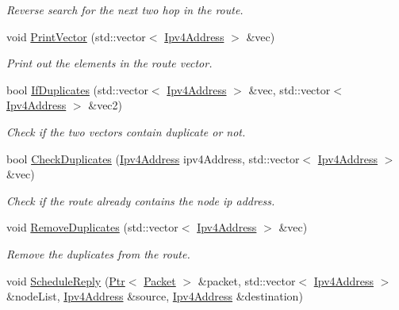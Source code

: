 \begin{DoxyCompactItemize}
\begin{DoxyCompactList}\small\item\em Reverse search for the next two hop in the route. \end{DoxyCompactList}\item 
void \hyperlink{classns3_1_1dsr_1_1DsrOptions_a44ae8e58769880ec9c0150bb28652350}{Print\+Vector} (std\+::vector$<$ \hyperlink{classns3_1_1Ipv4Address}{Ipv4\+Address} $>$ \&vec)
\begin{DoxyCompactList}\small\item\em Print out the elements in the route vector. \end{DoxyCompactList}\item 
bool \hyperlink{classns3_1_1dsr_1_1DsrOptions_a46fdbfab9423d644ad211c55b32ed74d}{If\+Duplicates} (std\+::vector$<$ \hyperlink{classns3_1_1Ipv4Address}{Ipv4\+Address} $>$ \&vec, std\+::vector$<$ \hyperlink{classns3_1_1Ipv4Address}{Ipv4\+Address} $>$ \&vec2)
\begin{DoxyCompactList}\small\item\em Check if the two vectors contain duplicate or not. \end{DoxyCompactList}\item 
bool \hyperlink{classns3_1_1dsr_1_1DsrOptions_a2d973cc79c1a784317f3b03a834a831e}{Check\+Duplicates} (\hyperlink{classns3_1_1Ipv4Address}{Ipv4\+Address} ipv4\+Address, std\+::vector$<$ \hyperlink{classns3_1_1Ipv4Address}{Ipv4\+Address} $>$ \&vec)
\begin{DoxyCompactList}\small\item\em Check if the route already contains the node ip address. \end{DoxyCompactList}\item 
void \hyperlink{classns3_1_1dsr_1_1DsrOptions_a7b822a7c827006feddd82cc9baab03bd}{Remove\+Duplicates} (std\+::vector$<$ \hyperlink{classns3_1_1Ipv4Address}{Ipv4\+Address} $>$ \&vec)
\begin{DoxyCompactList}\small\item\em Remove the duplicates from the route. \end{DoxyCompactList}\item 
void \hyperlink{classns3_1_1dsr_1_1DsrOptions_aad85e853073be9d366e5f5d16a66d6f5}{Schedule\+Reply} (\hyperlink{classns3_1_1Ptr}{Ptr}$<$ \hyperlink{classns3_1_1Packet}{Packet} $>$ \&packet, std\+::vector$<$ \hyperlink{classns3_1_1Ipv4Address}{Ipv4\+Address} $>$ \&node\+List, \hyperlink{classns3_1_1Ipv4Address}{Ipv4\+Address} \&source, \hyperlink{classns3_1_1Ipv4Address}{Ipv4\+Address} \&destination)

\end{DoxyCompactItemize}
